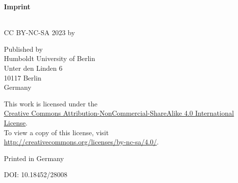 \mygeometry
\pagestyle{fancy}
\fancyhf{} %
\renewcommand{\headrulewidth}{0pt} %

\fancyhead[RE]{} %

\fancyhead[LO]{} %
\fancyhead[RO]{{\footnotesize {\rightmark}}\quad\thepage}

\newpage
\thispagestyle{empty} %

\vspace*{\fill} %

\begin{center}
{\Large \textbf{Imprint}}

\vspace{1cm}

\noindent \textit{\thesistitle} \\
\vspace{0.1cm}
CC BY-NC-SA 2023 by \thesisauthor
\vspace{1cm}

Published by \\
Humboldt University of Berlin \\
Unter den Linden 6 \\
10117 Berlin \\
Germany

\vspace{1cm}

This work is licensed under the\\
\href{http://creativecommons.org/licenses/by-nc-sa/4.0/}{Creative Commons Attribution-NonCommercial-ShareAlike 4.0 International License}.\\
To view a copy of this license, visit\\
\url{http://creativecommons.org/licenses/by-nc-sa/4.0/}.

\vspace{1cm}

Printed in Germany

\vspace{1cm}

DOI: 10.18452/28008
\end{center}

